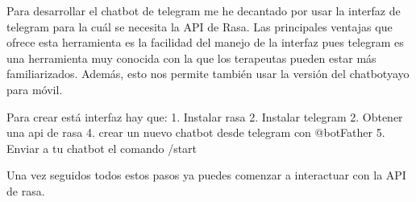 Para desarrollar el chatbot de telegram me he decantado por usar la interfaz de telegram para la cuál se necesita la API de Rasa. Las principales ventajas que ofrece esta herramienta es la facilidad del manejo de la interfaz pues telegram es una herramienta muy conocida con la que los terapeutas pueden estar más familiarizados. Además, esto nos permite también usar la versión del chatbotyayo para móvil. 

Para crear está interfaz hay que: 
1. Instalar rasa
2. Instalar telegram 
2. Obtener una api de rasa
4. crear un nuevo chatbot desde telegram con @botFather
5. Enviar a tu chatbot el comando /start

Una vez seguidos todos estos pasos ya puedes comenzar a interactuar con la API de rasa. 


